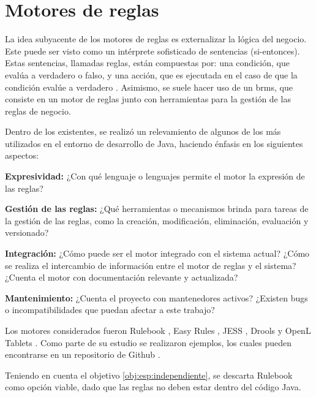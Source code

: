 \section{Motores de reglas}\label{sec:motores}

La idea subyacente de los motores de reglas es externalizar la lógica del negocio. 
Este puede ser visto como un intérprete sofisticado de sentencias  (si-entonces). Estas sentencias, llamadas reglas, están compuestas por: una condición, que evalúa a verdadero o falso, y una acción, que es ejecutada en el caso de que la condición evalúe a verdadero \cite{qusay2005jsr94}.
Asimismo, se suele hacer uso de un \acrshort{brms}, que consiste en un motor de reglas junto con herramientas para la gestión de las reglas de negocio.

Dentro de los existentes, se realizó un relevamiento de algunos de los más utilizados en el entorno de desarrollo de Java, haciendo énfasis en los siguientes aspectos:
\begin{enumerate*}[label=(\alph*)]
    \item 
    \label{comp:expresividad}
    \textbf{Expresividad:}
    ¿Con qué lenguaje o lenguajes permite el motor la expresión de las reglas?
    \item 
    \label{comp:gestion}
    \textbf{Gestión de las reglas:}
    ¿Qué herramientas o mecanismos brinda para tareas de la gestión de las reglas, como la creación, modificación, eliminación, evaluación y versionado?
    \item 
    \label{comp:integracion}
    \textbf{Integración:}
    ¿Cómo puede ser el motor integrado con el sistema actual? ¿Cómo se realiza el intercambio de información entre el motor de reglas y el sistema? ¿Cuenta el motor con documentación relevante y actualizada?
    \item 
    \label{comp:mantenimiento}
    \textbf{Mantenimiento:}
    ¿Cuenta el proyecto con mantenedores activos? ¿Existen bugs o incompatibilidades que puedan afectar a este trabajo?
\end{enumerate*}

Los motores considerados fueron Rulebook \cite{rulebook}, Easy Rules \cite{easy-rules}, JESS \cite{jess}, Drools \cite{drools} y OpenL Tablets \cite{openl}.
Como parte de su estudio se realizaron ejemplos, los cuales pueden encontrarse en un repositorio de Github \cite{ejemplos}.

Teniendo en cuenta el objetivo \ref{obj:esp:independiente}, se descarta Rulebook como opción viable, dado que las reglas no deben estar dentro del código Java.

